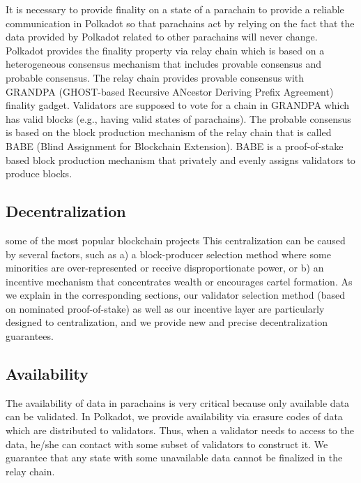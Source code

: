  It is necessary to provide finality on a state of a parachain  to provide a reliable communication in Polkadot so that parachains act by relying on the fact that the data provided by Polkadot related to other parachains will never change.  Polkadot provides the finality property via relay chain which is based on a heterogeneous consensus mechanism that includes provable consensus and probable consensus. The relay chain provides provable consensus with GRANDPA (GHOST-based Recursive ANcestor Deriving Prefix Agreement)  finality gadget. Validators are supposed to vote for a chain in GRANDPA  which has valid blocks (e.g., having valid states of parachains). The probable consensus is based on the block production mechanism of the relay chain that is called BABE (Blind Assignment for Blockchain Extension). BABE is a proof-of-stake based block production mechanism that privately and evenly assigns validators to produce blocks.

\subsection{Decentralization}

 some of the most popular blockchain projects 
This centralization can be caused by several factors, such as
a) a block-producer selection method where some minorities are over-represented or receive disproportionate power, or
b) an incentive mechanism that concentrates wealth or encourages cartel formation.
As we explain in the corresponding sections, our validator selection method (based on nominated proof-of-stake)
as well as our incentive layer are particularly designed to   centralization,
and we provide new and precise decentralization guarantees.


\subsection{Availability}\label{sec:availability}
 The availability of data in parachains is very critical because only available data can be validated.  In Polkadot, we provide availability via erasure codes of data which are distributed to validators. Thus, when a validator needs to access to the data, he/she can contact with some subset of validators to construct it. We guarantee that any state with some unavailable data cannot be finalized in the relay chain.


